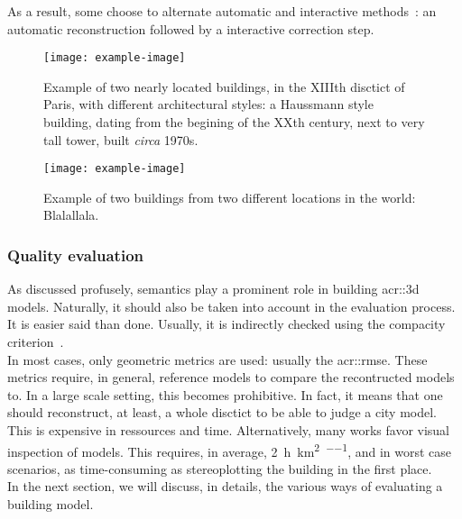             As a result, some choose to alternate automatic and interactive methods~\parencite{musialski2013survey}: an automatic reconstruction followed by a interactive correction step.
            \begin{figure}[htpb]
                \centering
                \texttt{[image: example-image]}            
                \caption{
                    \label{fig::xiiith_paris_haussmann_tower} Example of two nearly located buildings, in the XIIIth disctict of Paris, with different architectural styles:
                    a Haussmann style building, dating from the begining of the XXth century, next to very tall tower, built \textit{circa} 1970s.
                }
            \end{figure}
            \begin{figure}[htpb]
                \centering
                \texttt{[image: example-image]}            
                \caption{
                    \label{fig::different_regions} Example of two buildings from two different locations in the world:
                    Blalallala.
                }
            \end{figure}
        
        \subsubsection{Quality evaluation}
            As discussed profusely, semantics play a prominent role in building \gls{acr::3d} models.
            Naturally, it should also be taken into account in the evaluation process.
            It is easier said than done.
            Usually, it is indirectly checked using the compacity criterion~\parencite{lafarge_ijcv12}.\\
            In most cases, only geometric metrics are used: usually the \gls{acr::rmse}.
            These metrics require, in general, reference models to compare the recontructed models to.
            In a large scale setting, this becomes prohibitive.
            In fact, it means that one should reconstruct, at least, a whole disctict to be able to judge a city model.
            This is expensive in ressources and time.
            Alternatively, many works favor visual inspection of models.
            This requires, in average, \SI[per-mode=repeated-symbol]{2}{\hour\per\km\squared\per\expert}, and in worst case scenarios, as time-consuming  as stereoplotting the building in the first place.\\
            In the next section, we will discuss, in details, the various ways of evaluating a building model.

